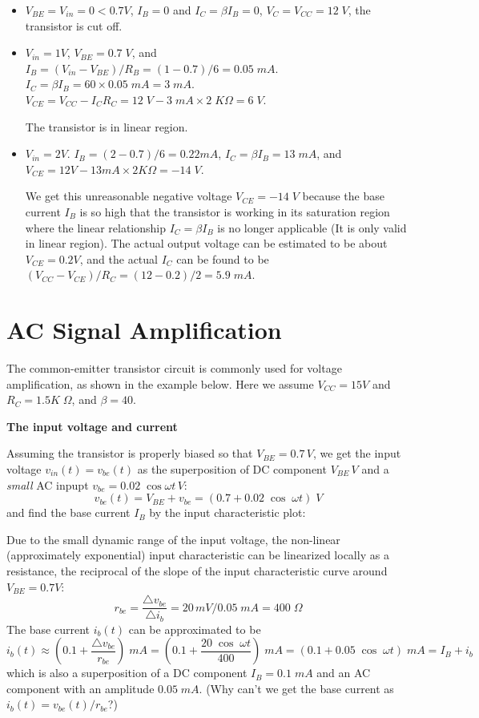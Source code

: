 \begin{itemize}
\item $V_{BE}=V_{in}=0<0.7V$, $I_B=0$ and $I_C=\beta I_B=0$, $V_C=V_{CC}=12\;V$,
  the transistor is cut off.

\item $V_{in}=1V$, $V_{BE}=0.7\;V$, and $I_B=(V_{in}-V_{BE})/R_B=(1-0.7)/6=0.05\;mA$.
  $I_C=\beta I_B=60\times 0.05\;mA=3\; mA$.
  $V_{CE}=V_{CC}-I_C R_C=12\;V-3\;mA \times 2\;K\Omega=6\;V$. 

  The transistor is in linear region.
 
\item $V_{in}=2V$. $I_B=(2-0.7)/6=0.22mA$, $I_C=\beta I_B=13\;mA$, and 
  $V_{CE}=12V-13mA\times 2K\Omega=-14\;V$.

  We get this unreasonable negative voltage $V_{CE}=-14\;V$ because the base 
  current $I_B$ is so high that the transistor is working in its saturation
  region where the linear relationship $I_C=\beta I_B$ is no longer applicable 
  (It is only valid in linear region). The actual output voltage can be 
  estimated to be about $V_{CE}=0.2V$, and the actual $I_C$ can be found to 
  be $(V_{CC}-V_{CE})/R_C=(12-0.2)/2=5.9\;mA$.
\end{itemize}

\section*{AC Signal Amplification}

The common-emitter transistor circuit is commonly used for voltage
amplification, as shown in the example below. Here we assume $V_{CC}=15V$
and $R_C=1.5K\;\Omega$, and $\beta=40$. 


{\bf The input voltage and current}

Assuming the transistor is properly biased so that $V_{BE}=0.7\,V$, we get
the input voltage $v_{in}(t)=v_{be}(t)$ as the superposition of DC component
$V_{BE}\,V$ and a {\em small} AC inpupt $v_{be}=0.02\;\cos\omega t\,V$:
\[
v_{be}(t)=V_{BE}+v_{be}=(0.7+0.02\;\cos\;\omega t) \;V 
\]
and find the base current $I_B$ by the input characteristic plot:


Due to the small dynamic range of the input voltage, the non-linear 
(approximately exponential) input characteristic can be linearized
locally as a resistance, the reciprocal of the slope of the input 
characteristic curve around $V_{BE}=0.7V$:
\[
r_{be}=\frac{\triangle v_{be}}{\triangle i_b}=20\,mV/0.05\;mA=400 \;\Omega
\]
The base current $i_b(t)$ can be approximated to be 
\[ 
i_b(t)\approx \left(0.1+\frac{\triangle v_{be}}{r_{be}}\right)\;mA
=\left(0.1+\frac{20\;\cos\;\omega t}{400}\right)\;mA
=(0.1+0.05\;\cos\;\omega t)\;mA =I_B+i_b
\]
which is also a superposition of a DC component $I_B=0.1\;mA$ and an AC 
component with an amplitude $0.05\;mA$. (Why can't we get the base current
as $i_b(t)=v_{be}(t)/r_{be}$?)

